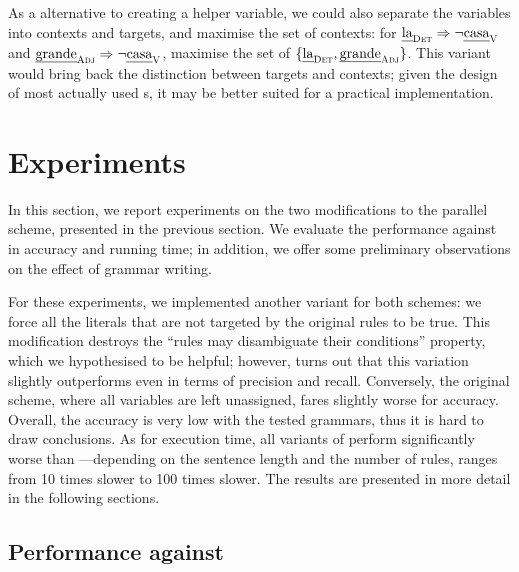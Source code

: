 As a alternative to creating a helper variable, we could also separate the variables into
contexts and targets, and maximise the set of contexts: for $\text{\em la}_{\text{\sc Det}} \Rightarrow \neg \text{\em casa}_{\text{\sc V}}$
and $\text{\em grande}_{\text{\sc Adj}} \Rightarrow \neg \text{\em casa}_{\text{\sc V}}$, maximise the set of $\{\text{\em la}_{\text{\sc Det}}, \text{\em grande}_{\text{\sc Adj}}\}$.
This variant would bring back the distinction between targets and contexts; given the design of most actually used \onlycg{}s, it may be better suited for a practical implementation.



\section{Experiments}
\label{sec:eval}

In this section, we report experiments on the two modifications to the parallel scheme,
presented in the previous section.
We evaluate the performance against  in accuracy and running time; in addition, we offer some preliminary observations on the effect of grammar writing.

For these experiments, we implemented another variant for both schemes:
we force all the literals that are not targeted by the original rules to be true.
This modification destroys the ``rules may disambiguate their conditions'' property,
which we hypothesised to be helpful; however, turns out that this variation
slightly outperforms even  in terms of precision and recall.
Conversely, the original \satcg{} scheme, where all variables are left unassigned,
fares slightly worse for accuracy.
Overall, the accuracy is very low with the tested grammars, thus it is hard to draw conclusions.
As for execution time, all variants of \satcg{} perform significantly worse than ---depending on the sentence length and the number of rules, \satcg{} ranges from 10 times slower to 100 times slower.
The results are presented in more detail in the following sections.





\def\satcgMax{\satcg{}\textsubscript{Max}}
\def\satcgOrd{\satcg{}\textsubscript{Ord}}

\subsection{Performance against }


